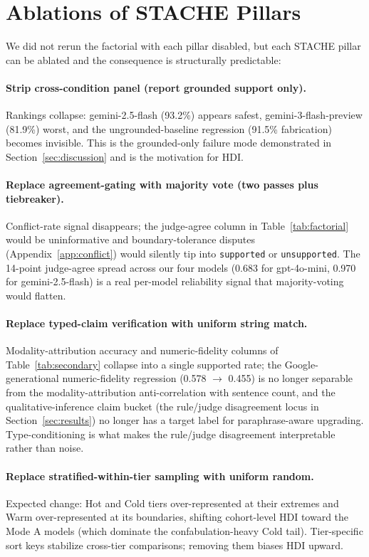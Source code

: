 \documentclass[11pt]{article}
\begin{document}
\section{Ablations of STACHE Pillars}
\label{app:ablations}

We did not rerun the factorial with each pillar disabled, but each STACHE pillar can be ablated and the consequence is structurally predictable:

\paragraph{Strip cross-condition panel (report grounded support only).} Rankings collapse: gemini-2.5-flash (93.2\%) appears safest, gemini-3-flash-preview (81.9\%) worst, and the ungrounded-baseline regression (91.5\% fabrication) becomes invisible. This is the grounded-only failure mode demonstrated in Section~\ref{sec:discussion} and is the motivation for HDI.

\paragraph{Replace agreement-gating with majority vote (two passes plus tiebreaker).} Conflict-rate signal disappears; the judge-agree column in Table~\ref{tab:factorial} would be uninformative and boundary-tolerance disputes (Appendix~\ref{app:conflict}) would silently tip into \texttt{supported} or \texttt{unsupported}. The 14-point judge-agree spread across our four models (0.683 for gpt-4o-mini, 0.970 for gemini-2.5-flash) is a real per-model reliability signal that majority-voting would flatten.

\paragraph{Replace typed-claim verification with uniform string match.} Modality-attribution accuracy and numeric-fidelity columns of Table~\ref{tab:secondary} collapse into a single supported rate; the Google-generational numeric-fidelity regression (0.578 $\to$ 0.455) is no longer separable from the modality-attribution anti-correlation with sentence count, and the qualitative-inference claim bucket (the rule/judge disagreement locus in Section~\ref{sec:results}) no longer has a target label for paraphrase-aware upgrading. Type-conditioning is what makes the rule/judge disagreement interpretable rather than noise.

\paragraph{Replace stratified-within-tier sampling with uniform random.} Expected change: Hot and Cold tiers over-represented at their extremes and Warm over-represented at its boundaries, shifting cohort-level HDI toward the Mode A models (which dominate the confabulation-heavy Cold tail). Tier-specific sort keys stabilize cross-tier comparisons; removing them biases HDI upward.
\end{document}
